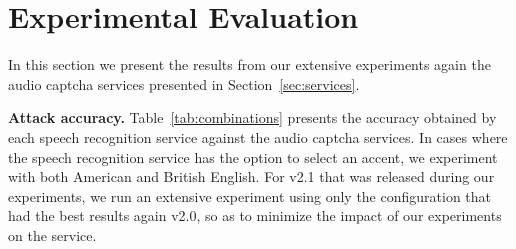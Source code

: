 %
\section{Experimental Evaluation}
\label{sec:evaluation}

In this section we present the results from our extensive experiments again 
the audio captcha services presented in Section~\ref{sec:services}.

\textbf{Attack accuracy.} Table~\ref{tab:combinations} presents the accuracy obtained by each speech recognition service 
against the audio captcha services. In cases where the speech recognition service has the option to select an accent,
we experiment with both American and British English. For \re v2.1 that was released during our experiments, we run
an extensive experiment using only the configuration that had the best results again v2.0, so as to minimize the 
impact of our experiments on the \re service.


